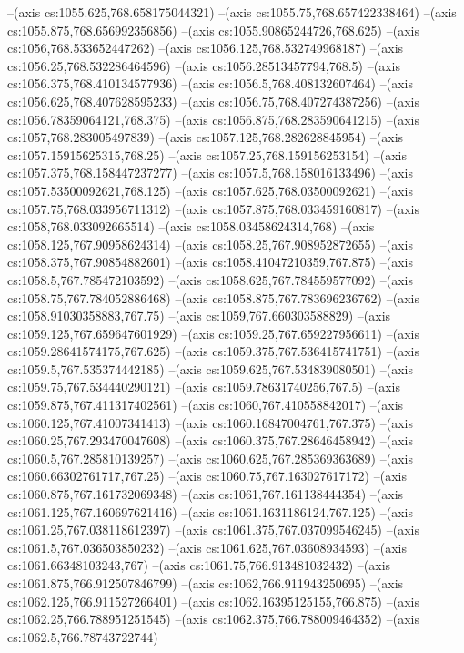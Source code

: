 --(axis cs:1055.625,768.658175044321)
--(axis cs:1055.75,768.657422338464)
--(axis cs:1055.875,768.656992356856)
--(axis cs:1055.90865244726,768.625)
--(axis cs:1056,768.533652447262)
--(axis cs:1056.125,768.532749968187)
--(axis cs:1056.25,768.532286464596)
--(axis cs:1056.28513457794,768.5)
--(axis cs:1056.375,768.410134577936)
--(axis cs:1056.5,768.408132607464)
--(axis cs:1056.625,768.407628595233)
--(axis cs:1056.75,768.407274387256)
--(axis cs:1056.78359064121,768.375)
--(axis cs:1056.875,768.283590641215)
--(axis cs:1057,768.283005497839)
--(axis cs:1057.125,768.282628845954)
--(axis cs:1057.15915625315,768.25)
--(axis cs:1057.25,768.159156253154)
--(axis cs:1057.375,768.158447237277)
--(axis cs:1057.5,768.158016133496)
--(axis cs:1057.53500092621,768.125)
--(axis cs:1057.625,768.03500092621)
--(axis cs:1057.75,768.033956711312)
--(axis cs:1057.875,768.033459160817)
--(axis cs:1058,768.033092665514)
--(axis cs:1058.03458624314,768)
--(axis cs:1058.125,767.90958624314)
--(axis cs:1058.25,767.908952872655)
--(axis cs:1058.375,767.90854882601)
--(axis cs:1058.41047210359,767.875)
--(axis cs:1058.5,767.785472103592)
--(axis cs:1058.625,767.784559577092)
--(axis cs:1058.75,767.784052886468)
--(axis cs:1058.875,767.783696236762)
--(axis cs:1058.91030358883,767.75)
--(axis cs:1059,767.660303588829)
--(axis cs:1059.125,767.659647601929)
--(axis cs:1059.25,767.659227956611)
--(axis cs:1059.28641574175,767.625)
--(axis cs:1059.375,767.536415741751)
--(axis cs:1059.5,767.535374442185)
--(axis cs:1059.625,767.534839080501)
--(axis cs:1059.75,767.534440290121)
--(axis cs:1059.78631740256,767.5)
--(axis cs:1059.875,767.411317402561)
--(axis cs:1060,767.410558842017)
--(axis cs:1060.125,767.41007341413)
--(axis cs:1060.16847004761,767.375)
--(axis cs:1060.25,767.293470047608)
--(axis cs:1060.375,767.28646458942)
--(axis cs:1060.5,767.285810139257)
--(axis cs:1060.625,767.285369363689)
--(axis cs:1060.66302761717,767.25)
--(axis cs:1060.75,767.163027617172)
--(axis cs:1060.875,767.161732069348)
--(axis cs:1061,767.161138444354)
--(axis cs:1061.125,767.160697621416)
--(axis cs:1061.1631186124,767.125)
--(axis cs:1061.25,767.038118612397)
--(axis cs:1061.375,767.037099546245)
--(axis cs:1061.5,767.036503850232)
--(axis cs:1061.625,767.03608934593)
--(axis cs:1061.66348103243,767)
--(axis cs:1061.75,766.913481032432)
--(axis cs:1061.875,766.912507846799)
--(axis cs:1062,766.911943250695)
--(axis cs:1062.125,766.911527266401)
--(axis cs:1062.16395125155,766.875)
--(axis cs:1062.25,766.788951251545)
--(axis cs:1062.375,766.788009464352)
--(axis cs:1062.5,766.78743722744)
